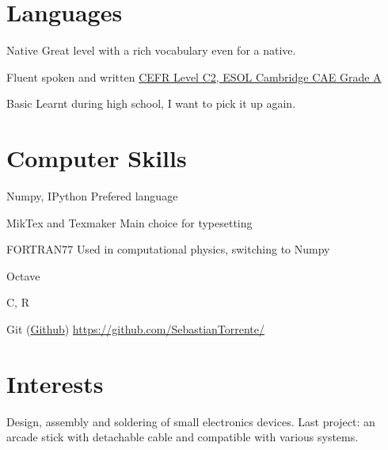\documentclass[11pt,a4paper,roman]{moderncv}
\begin{document}

\section{Languages}
	{Native}
	{Great level with a rich vocabulary even for a native.}

	{Fluent spoken and written}
	{\href{https://dl.dropbox.com/u/87894135/StatementOfResult.pdf}
	{CEFR Level C2, ESOL Cambridge CAE Grade A}}

	{Basic}
	{Learnt during high school, I want to pick it up again.}


\section{Computer Skills}

	{Numpy, IPython}
	{Prefered language}

\cvitemwithcomment{\LaTeX}
	{MikTex and Texmaker}
	{Main choice for typesetting}

	{FORTRAN77}
	{Used in computational physics, switching to Numpy}

	{Octave}
	{}

	{C, R}
	{}


	{Git (\href{https://github.com/SebastianTorrente/}
	{Github})}
	{\href{https://github.com/SebastianTorrente/}
	{https://github.com/SebastianTorrente/}}


\section{Interests}

	{Design, assembly and soldering of small electronics devices. Last project: an arcade stick with detachable cable and compatible with various systems.}
\end{document}

